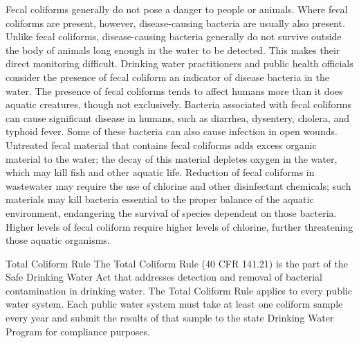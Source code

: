 \documentclass{article}
\begin{document}
Fecal coliforms generally do not pose a danger to people or animals.
Where fecal coliforms are present, however, disease-causing bacteria are
usually also present. Unlike fecal coliforms, disease-causing bacteria
generally do not survive outside the body of animals long enough in the
water to be detected. This makes their direct monitoring difficult.
Drinking water practitioners and public health officials consider the
presence of fecal coliform an indicator of disease bacteria in the
water. The presence of fecal coliforms tends to affect humans more than
it does aquatic creatures, though not exclusively. Bacteria associated
with fecal coliforms can cause significant disease in humans, such as
diarrhea, dysentery, cholera, and typhoid fever. Some of these bacteria
can also cause infection in open wounds. Untreated fecal material that
contains fecal coliforms adds excess organic material to the water; the
decay of this material depletes oxygen in the water, which may kill fish
and other aquatic life. Reduction of fecal coliforms in wastewater may
require the use of chlorine and other disinfectant chemicals; such
materials may kill bacteria essential to the proper balance of the
aquatic environment, endangering the survival of species dependent on
those bacteria. Higher levels of fecal coliform require higher levels of
chlorine, further threatening those aquatic organisms.

Total Coliform Rule The Total Coliform Rule (40 CFR 141.21) is the part
of the Safe Drinking Water Act that addresses detection and removal of
bacterial contamination in drinking water. The Total Coliform Rule
applies to every public water system. Each public water system must take
at least one coliform sample every year and submit the results of that
sample to the state Drinking Water Program for compliance purposes.
\end{document}
